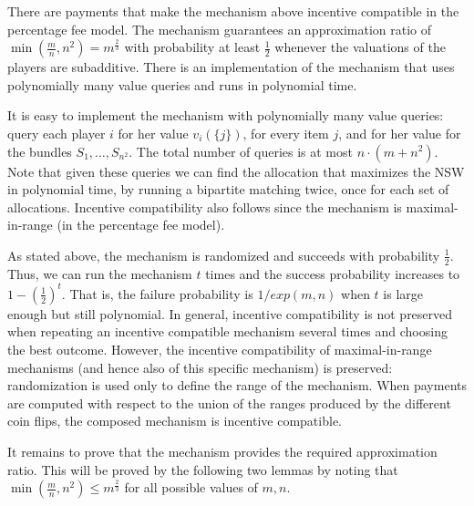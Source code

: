 \documentclass{theoretics}
\begin{document}
\begin{theorem}
There are payments that make the mechanism above incentive compatible in the percentage fee model. The mechanism guarantees an approximation ratio of $\min(\frac m n, n^2)=m^{\frac 2 3}$ with probability at least $\frac 1 2$ whenever the valuations of the players are subadditive. There is an implementation of the mechanism that uses polynomially many value queries and runs in polynomial time.
\end{theorem}

It is easy to implement the mechanism with polynomially many value queries: query each player $i$ for her value $v_i(\{j\})$, for every item $j$, and for her value for the bundles $S_1,\ldots, S_{n^2}$. The total number of queries is at most $n\cdot (m+n^2)$. Note that given these queries we can find the allocation that maximizes the NSW in polynomial time, by running a bipartite matching twice, once for each set of allocations. Incentive compatibility also follows since the mechanism is maximal-in-range (in the percentage fee model). 

As stated above, the mechanism is randomized and succeeds with probability $\frac 1  2$. Thus, we can run the mechanism $t$ times and the success probability increases to $1-(\frac 1 2)^t$. That is, the failure probability is $1/exp(m,n)$ when $t$ is large enough but still polynomial. In general, incentive compatibility is not preserved when repeating an incentive compatible mechanism several times and choosing the best outcome. However, the incentive compatibility of maximal-in-range mechanisms (and hence also of this specific mechanism) is preserved: randomization is used only to define the range of the mechanism. When payments are computed with respect to the union of the ranges produced by the different coin flips, the composed mechanism is incentive compatible.

It remains to prove that the mechanism provides the required approximation ratio. This will be proved by the following two lemmas by noting that $\min(\frac m n, n^2)\leq m^{\frac 2 3}$ for all possible values of $m,n$.
\end{document}
